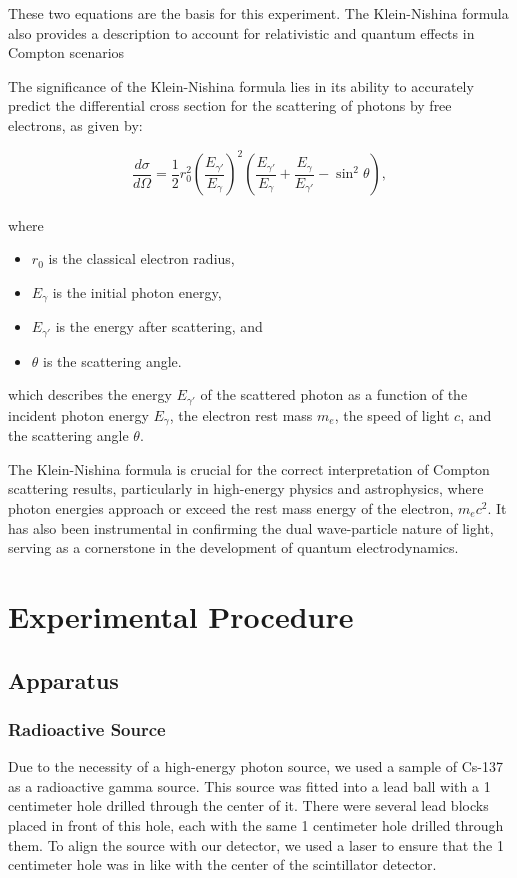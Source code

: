 \documentclass[10pt,letterpaper,onecolumn]{article}
\begin{document}
These two equations are the basis for this experiment.
The Klein-Nishina formula also provides a description to account for relativistic and quantum effects in Compton scenarios


The significance of the Klein-Nishina formula lies in its ability to accurately predict the differential cross section for the scattering of photons by free electrons, as given by:

\begin{equation}
\frac{d\sigma}{d\Omega} = \frac{1}{2} r_0^2 \left( \frac{E_{\gamma'}}{E_{\gamma}} \right)^2 \left( \frac{E_{\gamma'}}{E_{\gamma}} + \frac{E_{\gamma}}{E_{\gamma'}} - \sin^2 \theta \right),
\end{equation}
\\
where

\begin{itemize}
    \item  $r_0$ is the classical electron radius, 
    \item $E_{\gamma}$ is the initial photon energy, 
    \item $E_{\gamma'}$ is the energy after scattering, and
    \item  $\theta$ is the scattering angle.
    \end{itemize}   
which describes the energy \( E_{\gamma'} \) of the scattered photon as a function of the incident photon energy \( E_{\gamma} \), the electron rest mass \( m_e \), the speed of light \( c \), and the scattering angle \( \theta \).


The Klein-Nishina formula is crucial for the correct interpretation of Compton scattering results, particularly in high-energy physics and astrophysics, where photon energies approach or exceed the rest mass energy of the electron, \( m_e c^2 \). It has also been instrumental in confirming the dual wave-particle nature of light, serving as a cornerstone in the development of quantum electrodynamics.

\section{Experimental Procedure}
\subsection{Apparatus}
\subsubsection*{Radioactive Source}
Due to the necessity of a high-energy photon source, we used a sample of Cs-137 as a radioactive gamma source. This source was fitted into a lead ball with a 1 centimeter hole drilled through the center of it. There were several lead blocks placed in front of this hole, each with the same 1 centimeter hole drilled through them. To align the source with our detector, we used a laser to ensure that the 1 centimeter hole was in like with the center of the scintillator detector. 
\end{document}
